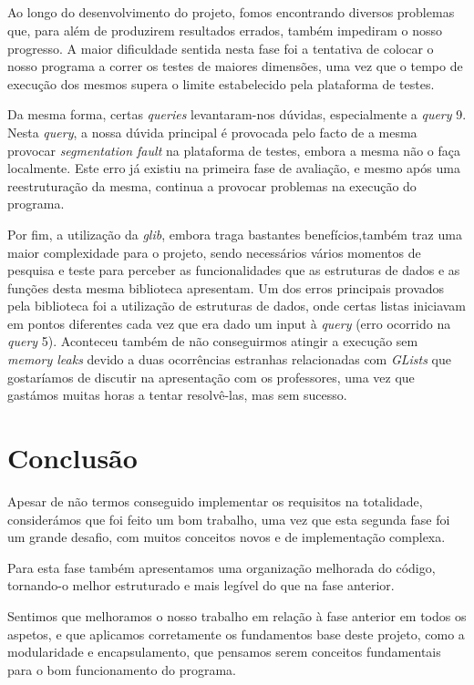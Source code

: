 \documentclass[12pt,a4paper]{report}
\begin{document}
    \paragraph{} Ao longo do desenvolvimento do projeto, fomos encontrando diversos problemas que, para além de produzirem resultados errados, também impediram o nosso progresso.
    A maior dificuldade sentida nesta fase foi a tentativa de colocar o nosso programa a correr os testes de maiores dimensões, uma vez que o tempo de execução dos mesmos supera o limite estabelecido pela plataforma de testes.
    \par Da mesma forma, certas \textit{queries} levantaram-nos dúvidas, especialmente a \textit{query} 9. Nesta \textit{query}, a nossa dúvida principal é provocada pelo facto de a mesma provocar \textit{segmentation fault} na plataforma de testes, embora a mesma não o faça localmente. Este erro já existiu na primeira fase de avaliação, e mesmo após uma reestruturação da mesma, continua a provocar problemas na execução do programa.
    \par Por fim, a utilização da \textit{glib}, embora traga bastantes benefícios,também traz uma maior complexidade para o projeto, sendo necessários vários momentos de pesquisa e teste para perceber as funcionalidades que as estruturas de dados e as funções desta mesma biblioteca apresentam. Um dos erros principais provados pela biblioteca foi a utilização de estruturas de dados, onde certas listas iniciavam em pontos diferentes cada vez que era dado um input à \textit{query} (erro ocorrido na \textit{query} 5). Aconteceu também de não conseguirmos atingir a execução sem \textit{memory leaks} devido a duas ocorrências estranhas relacionadas com \textit{GLists} que gostaríamos de discutir na apresentação com os professores, uma vez que gastámos muitas horas a tentar resolvê-las, mas sem sucesso.

    
    \chapter{Conclusão}
    \par Apesar de não termos conseguido implementar os requisitos na totalidade, considerámos que foi feito um bom trabalho, uma vez que esta segunda fase foi um grande desafio, com muitos conceitos novos e de implementação complexa.
    \par Para esta fase também apresentamos uma organização melhorada do código, tornando-o melhor estruturado e mais legível do que na fase anterior.
    \par Sentimos que melhoramos o nosso trabalho em relação à fase anterior em todos os aspetos, e que aplicamos corretamente os fundamentos base deste projeto, como a modularidade e encapsulamento, que pensamos serem conceitos fundamentais para o bom funcionamento do programa.
\end{document}
